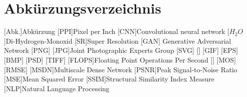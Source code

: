 
\chapter*{Abkürzungsverzeichnis}

\begin{acronym}[DHBW]
    [Abk.]{Abkürzung}
    [PPI]{Pixel per Inch}
    [CNN]{Convolutional neural network}
    [\ensuremath{H_2O}]{Di-Hydrogen-Monoxid}
    [SR]{Super Resolution}
    [GAN] {Generative Adversarial Network}
    [PNG]{}
    [JPG]{Joint Photographic Experts Group}
    [SVG]{}
    []{}
    [GIF]{}
    [EPS]{}
    [BMP]{}
    [PSD]{}
    [TIFF]{}
    [FLOPS]{Floating Point Operations Per Second}
    []{}
    [MOS]{}
    [RMSE]{}
    [MSDN]{Multiscale Dense Network}
    [PSNR]{Peak Signal-to-Noise Ratio}
    [MSE]{Mean Squared Error}
    [SSIM]{Structural Similarity Index Measure}
    [NLP]{Natural Language Processing}
\end{acronym}